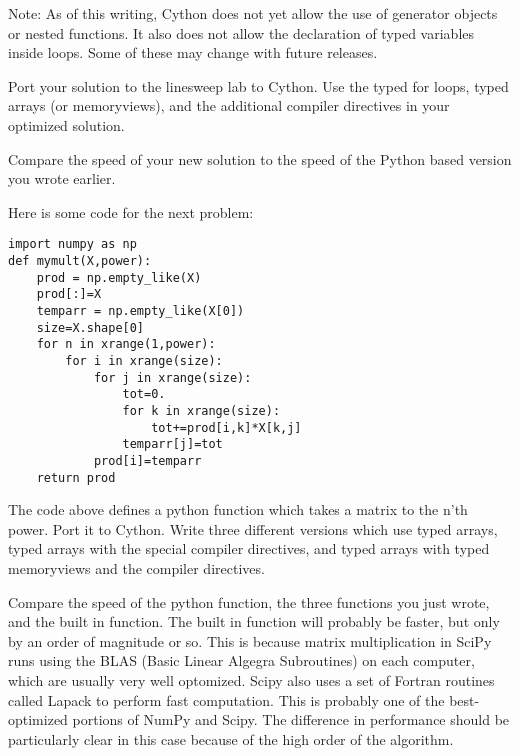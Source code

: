 Note: As of this writing, Cython does not yet allow the use of generator objects or nested functions.
It also does not allow the declaration of typed variables inside loops.
Some of these may change with future releases.

\begin{problem}
Port your solution to the linesweep lab to Cython.
Use the typed for loops, typed arrays (or memoryviews), and the additional compiler directives in your optimized solution.

Compare the speed of your new solution to the speed of the Python based version you wrote earlier.
\end{problem}

Here is some code for the next problem:
\begin{verbatim}
import numpy as np
def mymult(X,power):
    prod = np.empty_like(X)
    prod[:]=X
    temparr = np.empty_like(X[0])
    size=X.shape[0]
    for n in xrange(1,power):
        for i in xrange(size):
            for j in xrange(size):
                tot=0.
                for k in xrange(size):
                    tot+=prod[i,k]*X[k,j]
                temparr[j]=tot
            prod[i]=temparr
    return prod
\end{verbatim}

\begin{problem}
The code above defines a python function which takes a matrix to the n'th power.
Port it to Cython. Write three different versions which use typed arrays, typed arrays with the special compiler directives, and typed arrays with typed memoryviews and the compiler directives.

Compare the speed of the python function, the three functions you just wrote, and the built in  function.
The built in function will probably be faster, but only by an order of magnitude or so.
This is because matrix multiplication in SciPy runs using the BLAS (Basic Linear Algegra Subroutines) on each computer, which are usually very well optomized.
Scipy also uses a set of Fortran routines called Lapack to perform fast computation.
This is probably one of the best-optimized portions of NumPy and Scipy.
The difference in performance should be particularly clear in this case because of the high order of the algorithm.
\end{problem}
